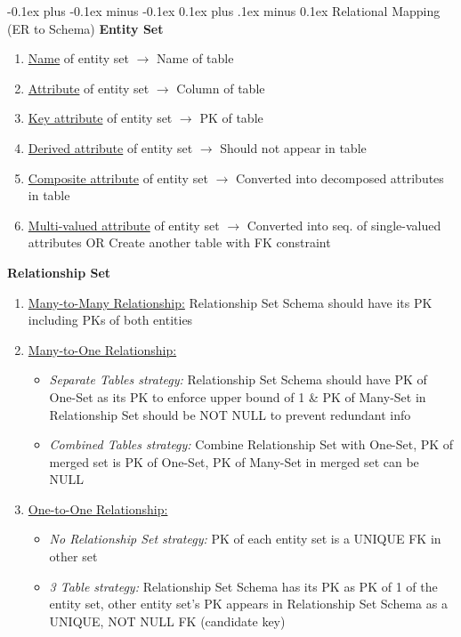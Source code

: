 \documentclass[landscape]{article}
\makeatletter
\renewcommand{\subsection}{\@startsection{subsection}{2}{0mm}%
  {-0.1ex plus -0.1ex minus -0.1ex}%
  {0.1ex plus .1ex minus 0.1ex}%
{\normalfont\scriptsize\bfseries}}
\makeatother
\begin{document}
\begin{multicols*}{5}
    \subsection{Relational Mapping (ER to Schema)}
    \textbf{Entity Set}
    \begin{enumerate}
      \item \underline{Name} of entity set $\rightarrow$ Name of table
      \item \underline{Attribute} of entity set $\rightarrow$ Column of table
      \item \underline{Key attribute} of entity set $\rightarrow$ PK of table
      \item \underline{Derived attribute} of entity set $\rightarrow$ Should not appear in table
      \item \underline{Composite attribute} of entity set $\rightarrow$ Converted into decomposed attributes in table
      \item \underline{Multi-valued attribute} of entity set $\rightarrow$ Converted into seq. of single-valued attributes OR Create another table with FK constraint
    \end{enumerate}
    \textbf{Relationship Set}
    \begin{enumerate}
      \item \underline{Many-to-Many Relationship:} Relationship Set Schema should have its PK including PKs of both entities
      \item \underline{Many-to-One Relationship:} 
      \begin{itemize}
        \item \textit{Separate Tables strategy:} Relationship Set Schema should have PK of One-Set as its PK to enforce upper bound of 1 \&  PK of Many-Set in Relationship Set should be NOT NULL to prevent redundant info
        \item \textit{Combined Tables strategy:} Combine Relationship Set with One-Set, PK of merged set is PK of One-Set, PK of Many-Set in merged set can be NULL
      \end{itemize}
      \item \underline{One-to-One Relationship:}
      \begin{itemize}
        \item \textit{No Relationship Set strategy:} PK of each entity set is a UNIQUE FK in other set
        \item \textit{3 Table strategy:} Relationship Set Schema has its PK as PK of 1 of the entity set, other entity set's PK appears in Relationship Set Schema as a UNIQUE, NOT NULL FK (candidate key)

\end{itemize}
\end{enumerate}
\end{multicols*}
\end{document}
